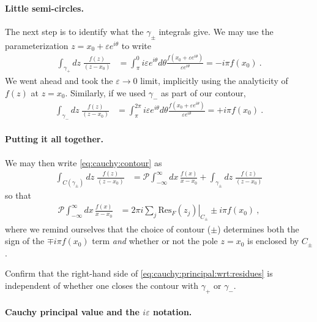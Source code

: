 \paragraph{Little semi-circles.}
The next step is to identify what the $\gamma_\pm$ integrals give. We may use the parameterization $z=x_0+\varepsilon e^{i\theta}$ to write
\begin{align}
	\int_{\gamma_+} dz \; \frac{f(z)}{(z-x_0)}
	&=
	\int_{\pi}^0 i\varepsilon e^{i\theta} d\theta \frac{f\left(x_0+\varepsilon e^{i\theta}\right)}{\varepsilon e^{i\theta}}
	=
	-i \pi f(x_0) \ .
\end{align}
We went ahead and took the $\varepsilon\to 0$ limit, implicitly using the analyticity of $f(z)$ at $z=x_0$. Similarly, if we used $\gamma_-$ as part of our contour,
\begin{align}
	\int_{\gamma_-} dz \; \frac{f(z)}{(z-x_0)}
	&=
	\int_{\pi}^{2\pi} i\varepsilon e^{i\theta} d\theta \frac{f\left(x_0+\varepsilon e^{i\theta}\right)}{\varepsilon e^{i\theta}}
	=
	+i \pi f(x_0) \ .
\end{align}

\paragraph{Putting it all together.}
We may then write \eqref{eq:cauchy:contour} as
\begin{align}
	\int_{C(\gamma_\pm)} dz \; \frac{f(z)}{(z-x_0)} &= 
	\mathcal P
	\int_{-\infty}^\infty dx\, \frac{f(x)}{x-x_0}
	+
	\int_{\gamma_\pm} dz \; \frac{f(z)}{(z-x_0)}
\end{align}
so that
\begin{align}
	\mathcal P
	\int_{-\infty}^\infty dx\, \frac{f(x)}{x-x_0}
	&=
	2\pi i \sum_j \left.\text{Res}_F(z_j)\right|_{C_\pm}
	\pm i \pi f(x_0) \ ,
	\label{eq:cauchy:principal:wrt:residues}
\end{align}
where we remind ourselves that the choice of contour ($\pm$) determines both the sign of the $\mp i \pi f(x_0)$ term \emph{and} whether or not the pole $z=x_0$ is enclosed by $C_\pm$. 
\begin{exercise}
Confirm that the right-hand side of \eqref{eq:cauchy:principal:wrt:residues} is independent of whether one closes the contour with $\gamma_+$ or $\gamma_-$.
\end{exercise}

\paragraph{Cauchy principal value and the $i\varepsilon$ notation.} %

